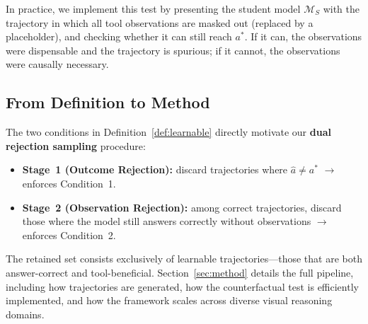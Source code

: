 In practice, we implement this test by presenting the student model $\mathcal{M}_S$ with the trajectory in which all tool observations are masked out (replaced by a placeholder), and checking whether it can still reach $a^*$.
If it can, the observations were dispensable and the trajectory is spurious; if it cannot, the observations were causally necessary.

\subsection{From Definition to Method}

The two conditions in Definition~\ref{def:learnable} directly motivate our \textbf{dual rejection sampling} procedure:
\begin{itemize}[leftmargin=*, itemsep=2pt]
    \item \textbf{Stage~1 (Outcome Rejection):} discard trajectories where $\hat{a} \neq a^*$ \;$\longrightarrow$\; enforces Condition~1.
    \item \textbf{Stage~2 (Observation Rejection):} among correct trajectories, discard those where the model still answers correctly without observations \;$\longrightarrow$\; enforces Condition~2.
\end{itemize}

The retained set consists exclusively of learnable trajectories—those that are both answer-correct and tool-beneficial.
Section~\ref{sec:method} details the full pipeline, including how trajectories are generated, how the counterfactual test is efficiently implemented, and how the framework scales across diverse visual reasoning domains.